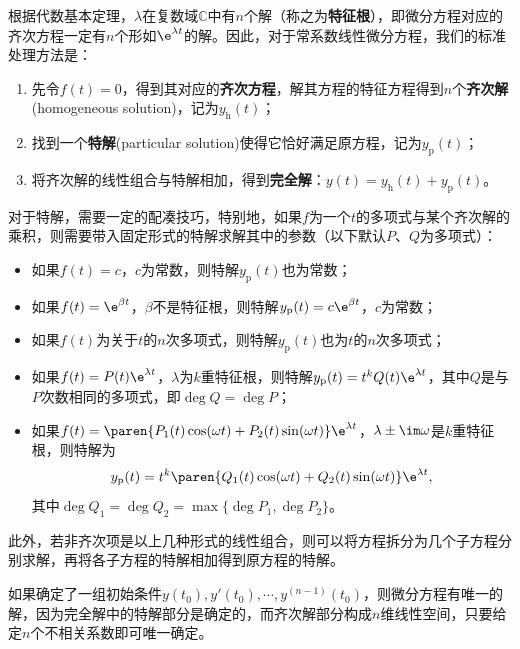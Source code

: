 根据代数基本定理，$\lambda$在复数域$\mathbb{C}$中有$n$个解（称之为\textbf{特征根}），即微分方程对应的齐次方程一定有$n$个形如$\e^{\lambda t}$的解。因此，对于常系数线性微分方程，我们的标准处理方法是：
\begin{enumerate}
    \item 先令$f(t)=0$，得到其对应的\textbf{齐次方程}，解其方程的特征方程得到$n$个\textbf{齐次解}(homogeneous solution)，记为$y_{\text{h}}(t)$；
    \item 找到一个\textbf{特解}(particular solution)使得它恰好满足原方程，记为$y_{\text{p}}(t)$；
    \item 将齐次解的线性组合与特解相加，得到\textbf{完全解}：$y(t)=y_{\text{h}}(t)+y_{\text{p}}(t)$。
\end{enumerate}
对于特解，需要一定的配凑技巧，特别地，如果$f$为一个$t$的多项式与某个齐次解的乘积，则需要带入固定形式的特解求解其中的参数（以下默认$P$、$Q$为多项式）：
\begin{itemize}
    \item 如果$f(t)=c$，$c$为常数，则特解$y_{\text{p}}(t)$也为常数；
    \item 如果$f(t)=\e^{\beta t}$，$\beta$不是特征根，则特解$y_{\text{p}}(t)=c\e^{\beta t}$，$c$为常数；
    \item 如果$f(t)$为关于$t$的$n$次多项式，则特解$y_{\text{p}}(t)$也为$t$的$n$次多项式；
    \item 如果$f(t)=P(t)\e^{\lambda t}$，$\lambda$为$k$重特征根，则特解$y_{\text{p}}(t)=t^k Q(t)\e^{\lambda t}$，其中$Q$是与$P$次数相同的多项式，即$\deg Q=\deg P$；
    \item 如果$f(t)=\paren{P_1(t)\cos(\omega t)+P_2(t)\sin(\omega t)}\e^{\lambda t}$，$\lambda\pm \im\omega$是$k$重特征根，则特解为
    \begin{equation}
        y_{\text{p}}(t)=t^k\paren{Q_1(t)\cos(\omega t)+Q_2(t)\sin(\omega t)}\e^{\lambda t},
    \end{equation}
    其中$\deg Q_1=\deg Q_2=\max\{\deg P_1,\deg P_2\}$。
\end{itemize}
此外，若非齐次项是以上几种形式的线性组合，则可以将方程拆分为几个子方程分别求解，再将各子方程的特解相加得到原方程的特解。

如果确定了一组初始条件$y(t_0),y'(t_0),\cdots,y^{(n-1)}(t_0)$，则微分方程有唯一的解，因为完全解中的特解部分是确定的，而齐次解部分构成$n$维线性空间，只要给定$n$个不相关系数即可唯一确定。


